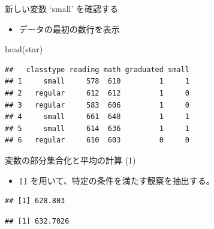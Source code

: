 \documentclass[
  ignorenonframetext,
]{beamer}
\newenvironment{Shaded}{\begin{snugshade}}{\end{snugshade}}
\newcommand{\CommentTok}[1]{\textcolor[rgb]{0.56,0.35,0.01}{\textit{#1}}}
\newcommand{\DecValTok}[1]{\textcolor[rgb]{0.00,0.00,0.81}{#1}}
\newcommand{\FunctionTok}[1]{\textcolor[rgb]{0.00,0.00,0.00}{#1}}
\newcommand{\NormalTok}[1]{#1}
\newcommand{\SpecialCharTok}[1]{\textcolor[rgb]{0.00,0.00,0.00}{#1}}
\providecommand{\tightlist}{%
  \setlength{\itemsep}{0pt}\setlength{\parskip}{0pt}}
\begin{document}
\begin{frame}[fragile]{新しい変数 `small' を確認する}
\protect\hypertarget{ux65b0ux3057ux3044ux5909ux6570-small-ux3092ux78baux8a8dux3059ux308b}{}
\begin{itemize}
\tightlist
\item
  データの最初の数行を表示
\end{itemize}

\begin{Shaded}
\begin{Highlighting}[]
\FunctionTok{head}\NormalTok{(star)}
\end{Highlighting}
\end{Shaded}

\begin{verbatim}
##   classtype reading math graduated small
## 1     small     578  610         1     1
## 2   regular     612  612         1     0
## 3   regular     583  606         1     0
## 4     small     661  648         1     1
## 5     small     614  636         1     1
## 6   regular     610  603         0     0
\end{verbatim}
\end{frame}

\begin{frame}[fragile]{変数の部分集合化と平均の計算 (1)}
\protect\hypertarget{ux5909ux6570ux306eux90e8ux5206ux96c6ux5408ux5316ux3068ux5e73ux5747ux306eux8a08ux7b97-1}{}
\begin{itemize}
\tightlist
\item
  \texttt{{[}{]}} を用いて、特定の条件を満たす観察を抽出する。
\end{itemize}

\begin{Shaded}
\end{Shaded}

\begin{verbatim}
## [1] 628.803
\end{verbatim}

\begin{Shaded}
\end{Shaded}

\begin{verbatim}
## [1] 632.7026
\end{verbatim}
\end{frame}
\end{document}
